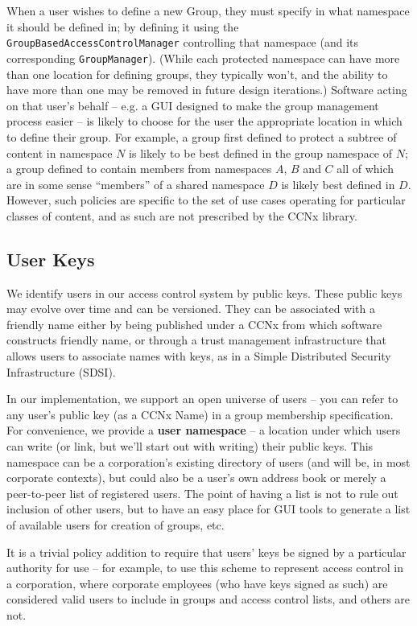 When a user wishes to define a new Group, they must specify in what
namespace it should be defined in; by defining it using the {\tt
  GroupBasedAccessControlManager} controlling that namespace (and its
corresponding {\tt GroupManager}). (While each protected namespace can
have more than one location for defining groups, they typically won't,
and the ability to have more than one may be removed in future design
iterations.) Software acting on that user's behalf -- e.g. a GUI
designed to make the group management process easier -- is likely to
choose for the user the appropriate location in which to define their
group. For example, a group first defined to protect a subtree of
content in namespace $N$ is likely to be best defined in the group
namespace of $N$; a group defined to contain members from namespaces
$A$, $B$ and $C$ all of which are in some sense ``members'' of a
shared namespace $D$ is likely best defined in $D$. However, such
policies are specific to the set of use cases operating for particular
classes of content, and as such are not prescribed by the CCNx
library.

\subsection{User Keys}

We identify users in our access control system by public keys. These
public keys may evolve over time and can be versioned. They can be
associated with a friendly name either by being published under a CCNx
from which software constructs friendly name, or through a trust
management infrastructure that allows users to associate names with
keys, as in a Simple Distributed Security Infrastructure (SDSI).

In our implementation, we support an open universe of users -- you can
refer to any user's public key (as a CCNx Name) in a group membership
specification. For convenience, we provide a {\bf user namespace} -- a
location under which users can write (or link, but we'll start out
with writing) their public keys. This namespace can be a corporation's
existing directory of users (and will be, in most corporate contexts),
but could also be a user's own address book or merely a peer-to-peer
list of registered users. The point of having a list is not to rule
out inclusion of other users, but to have an easy place for GUI tools
to generate a list of available users for creation of groups, etc.

It is a trivial policy addition to require that users' keys be signed
by a particular authority for use -- for example, to use this scheme
to represent access control in a corporation, where corporate
employees (who have keys signed as such) are considered valid users to
include in groups and access control lists, and others are not.

